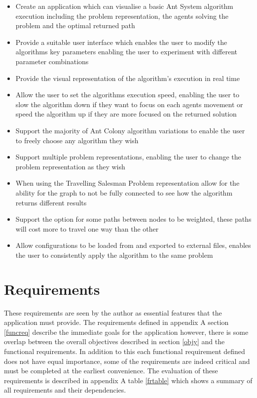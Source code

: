 \begin{itemize}
\item Create an application which can visualise a basic Ant System algorithm execution including the problem representation, the agents solving the problem and the optimal returned path
\item Provide a suitable user interface which enables the user to modify the algorithms key parameters enabling the user to experiment with different parameter combinations
\item Provide the visual representation of the algorithm’s execution in real time
\item Allow the user to set the algorithms execution speed, enabling the user to slow the algorithm down if they want to focus on each agents movement or speed the algorithm up if they are more focused on the returned solution
\item Support the majority of Ant Colony algorithm variations to enable the user to freely choose any algorithm they wish
\item Support multiple problem representations, enabling the user to change the problem representation as they wish
\item When using the Travelling Salesman Problem representation allow for the ability for the graph to not be fully connected to see how the algorithm returns different results
\item Support the option for some paths between nodes to be weighted, these paths will cost more to travel one way than the other
\item Allow configurations to be loaded from and exported to external files, enables the user to consistently apply the algorithm to the same problem
\end{itemize}


\section{Requirements}

These requirements are seen by the author as essential features that the application must provide. The requirements defined in appendix A section \ref{funcreq} describe the immediate goals for the application however, there is some overlap between the overall objectives described in section \ref{objy} and the functional requirements. In addition to this each functional requirement defined does not have equal importance, some of the requirements are indeed critical and must be completed at the earliest convenience. The evaluation of these requirements is described in appendix A table \ref{frtable} which shows a summary of all requirements and their dependencies.

